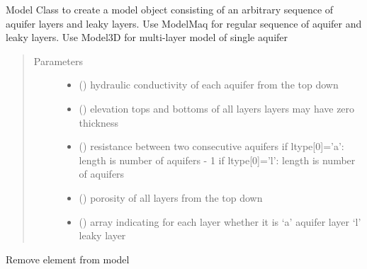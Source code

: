\documentclass[letterpaper,10pt,english]{sphinxmanual}
\begin{document}
\begin{fulllineitems}
\label{\detokenize{models/model:timml.model.Model}}
Model Class to create a model object consisting of an arbitrary
sequence of aquifer layers and leaky layers.
Use ModelMaq for regular sequence of aquifer and leaky layers.
Use Model3D for multi-layer model of single aquifer
\begin{quote}\begin{description}
\item[{Parameters}] \leavevmode\begin{itemize}
\item {} 
 () \textendash{} hydraulic conductivity of each aquifer from the top down

\item {} 
 () \textendash{} elevation tops and bottoms of all layers
layers may have zero thickness

\item {} 
 () \textendash{} resistance between two consecutive aquifers
if ltype{[}0{]}=’a’: length is number of aquifers - 1
if ltype{[}0{]}=’l’: length is number of aquifers

\item {} 
 () \textendash{} porosity of all layers from the top down

\item {} 
 () \textendash{} array indicating for each layer whether it is
‘a’ aquifer layer
‘l’ leaky layer

\end{itemize}

\end{description}\end{quote}

\begin{fulllineitems}
\label{\detokenize{models/model:timml.model.Model.remove_element}}
Remove element  from model


\end{fulllineitems}
\end{fulllineitems}
\end{document}
